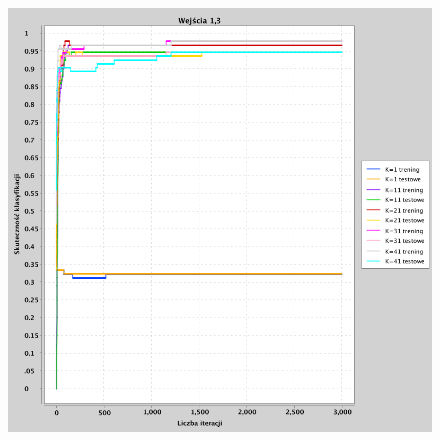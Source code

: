 \documentclass[a4paper, portrait,11pt]{article}
\begin{document}
\begin{figure}[!htb]
\begin{minipage}{0.33\textwidth}
    \caption{\label{fig:41_2_1,2derivative}}
  \end{minipage}
  \begin{minipage}{0.33\textwidth}
    \centering
    \includegraphics[width=1\linewidth]{../data/classification4/1/derivatives/2_1,3.png}
    \caption{\label{fig:41_2_1,3derivative}}
  \end{minipage}\hfill
\end{figure}
\end{document}
